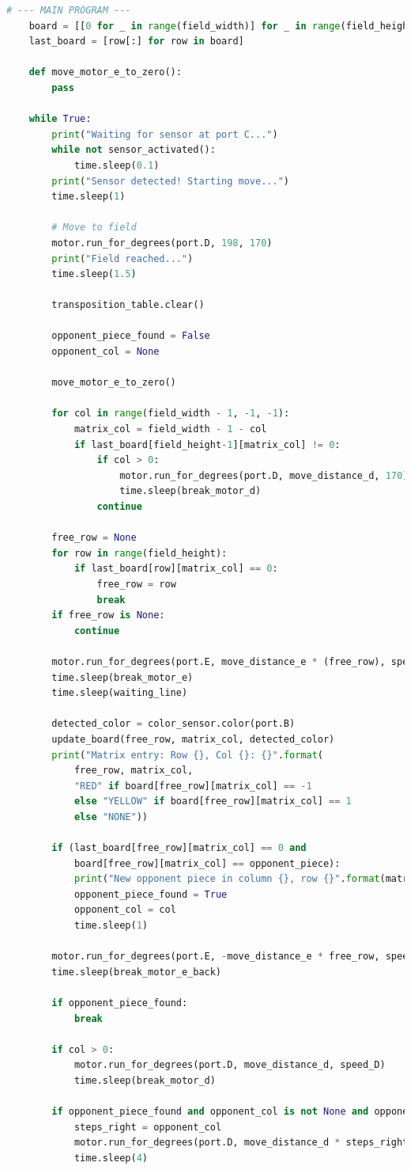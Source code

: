 \begin{lstlisting}[language=Python]
	# --- MAIN PROGRAM ---
	board = [[0 for _ in range(field_width)] for _ in range(field_height)]
	last_board = [row[:] for row in board]
	
	def move_motor_e_to_zero():
		pass
	
	while True:
		print("Waiting for sensor at port C...")
		while not sensor_activated():
			time.sleep(0.1)
		print("Sensor detected! Starting move...")
		time.sleep(1)
		
		# Move to field
		motor.run_for_degrees(port.D, 198, 170)
		print("Field reached...")
		time.sleep(1.5)
		
		transposition_table.clear()
		
		opponent_piece_found = False
		opponent_col = None
		
		move_motor_e_to_zero()
		
		for col in range(field_width - 1, -1, -1):
			matrix_col = field_width - 1 - col
			if last_board[field_height-1][matrix_col] != 0:
				if col > 0:
					motor.run_for_degrees(port.D, move_distance_d, 170)
					time.sleep(break_motor_d)
				continue
		
		free_row = None
		for row in range(field_height):
			if last_board[row][matrix_col] == 0:
				free_row = row
				break
		if free_row is None:
			continue
		
		motor.run_for_degrees(port.E, move_distance_e * (free_row), speed_E)
		time.sleep(break_motor_e)
		time.sleep(waiting_line)
		
		detected_color = color_sensor.color(port.B)
		update_board(free_row, matrix_col, detected_color)
		print("Matrix entry: Row {}, Col {}: {}".format(
			free_row, matrix_col,
			"RED" if board[free_row][matrix_col] == -1
			else "YELLOW" if board[free_row][matrix_col] == 1
			else "NONE"))
		
		if (last_board[free_row][matrix_col] == 0 and
			board[free_row][matrix_col] == opponent_piece):
			print("New opponent piece in column {}, row {}".format(matrix_col, free_row))
			opponent_piece_found = True
			opponent_col = col
			time.sleep(1)
		
		motor.run_for_degrees(port.E, -move_distance_e * free_row, speed_E)
		time.sleep(break_motor_e_back)
		
		if opponent_piece_found:
			break
		
		if col > 0:
			motor.run_for_degrees(port.D, move_distance_d, speed_D)
			time.sleep(break_motor_d)
		
		if opponent_piece_found and opponent_col is not None and opponent_col != 0:
			steps_right = opponent_col
			motor.run_for_degrees(port.D, move_distance_d * steps_right, speed_D)
			time.sleep(4)
			

\end{lstlisting}
